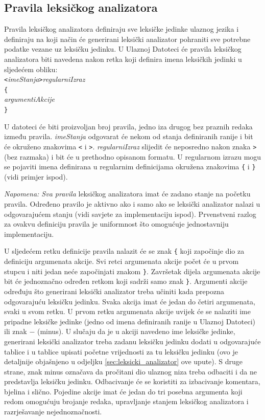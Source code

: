 \documentclass[times, 12pt, utf8]{book}
\begin{document}
\begin{lstlisting}[caption={Primjer imena stanja u Ulaznoj Datoteci.},label=lst:imena_jedinki]
%L IDENTIFIKATOR brojcanaKonstanta znakovnaKonstanta OP_PLUS
\end{lstlisting}

\subsection{Pravila leksičkog analizatora}
Pravila leksičkog analizatora definiraju sve leksičke jedinke ulaznog jezika i definiraju na koji način će generirani leksički analizator pohraniti sve potrebne podatke vezane uz leksičku jedinku.
U Ulaznoj Datoteci će pravila leksičkog analizatora biti navedena nakon retka koji definira imena leksičkih jedinki u sljedećem obliku:\\
\verb=<=\emph{imeStanja}\verb=>=\emph{regularniIzraz}\\
\verb|{|\\
\emph{argumentiAkcije}\\
\verb|}|

U datoteci će biti proizvoljan broj pravila, jedno iza drugog bez praznih redaka između pravila.
\emph{imeStanja} odgovarat će nekom od stanja definiranih ranije i bit će okruženo znakovima \verb|<| i \verb|>|.
\emph{regularniIzraz} slijedit će neposredno nakon znaka \verb|>| (bez razmaka) i bit će u prethodno opisanom formatu.
U regularnom izrazu mogu se pojaviti imena definirana u regularnim definicijama okružena znakovima \verb|{| i \verb|}| (vidi primjer ispod).

\emph{Napomena: Sva pravila} leksičkog analizatora imat će zadano stanje na početku pravila.
Određeno pravilo je aktivno ako i samo ako se leksički analizator nalazi u odgovarajućem stanju (vidi savjete za implementaciju ispod).
Prvenstveni razlog za ovakvu definiciju pravila je uniformnost što omogućuje jednostavniju implementaciju.

U sljedećem retku definicije pravila nalazit će se znak \verb|{| koji započinje dio za definiciju argumenata akcije.
Svi retci argumenata akcije počet će u prvom stupcu i niti jedan neće započinjati znakom \verb|}|.
Završetak dijela argumenata akcije bit će jednoznačno određen retkom koji sadrži samo znak \verb|}|.
Argumenti akcije određuju što generirani leksički analizator treba učiniti kada prepozna odgovarajuću leksičku jedinku.
Svaka akcija imat će jedan do četiri argumenata, svaki u svom retku.
U prvom retku argumenata akcije uvijek će se nalaziti ime pripadne leksičke jedinke (jedno od imena definiranih ranije u Ulaznoj Datoteci) ili znak \(-\) (minus).
U slučaju da je u akciji navedeno ime leksičke jedinke, generirani leksički analizator treba zadanu leksičku jedinku dodati u odgovarajuće tablice i u tablice upisati početne vrijednosti za tu leksičku jedinku (ovo je detaljnije objašnjeno u odjeljku \ref{sec:leksicki_analizator} ove upute).
S druge strane, znak minus označava da pročitani dio ulaznog niza treba odbaciti i da ne predstavlja leksičku jedinku.
Odbacivanje će se koristiti za izbacivanje komentara, bjelina i slično.
Pojedine akcije imat će jedan do tri posebna argumenta koji redom omogućuju brojanje redaka, upravljanje stanjem leksičkog analizatora i razrješavanje nejednoznačnosti.
\end{document}
